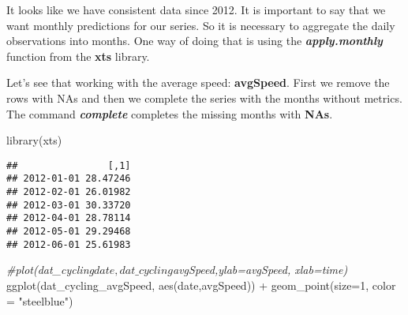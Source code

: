 \documentclass[
]{article}
\newenvironment{Shaded}{\begin{snugshade}}{\end{snugshade}}
\newcommand{\AttributeTok}[1]{\textcolor[rgb]{0.77,0.63,0.00}{#1}}
\newcommand{\CommentTok}[1]{\textcolor[rgb]{0.56,0.35,0.01}{\textit{#1}}}
\newcommand{\DecValTok}[1]{\textcolor[rgb]{0.00,0.00,0.81}{#1}}
\newcommand{\FunctionTok}[1]{\textcolor[rgb]{0.00,0.00,0.00}{#1}}
\newcommand{\NormalTok}[1]{#1}
\newcommand{\OtherTok}[1]{\textcolor[rgb]{0.56,0.35,0.01}{#1}}
\newcommand{\SpecialCharTok}[1]{\textcolor[rgb]{0.00,0.00,0.00}{#1}}
\newcommand{\StringTok}[1]{\textcolor[rgb]{0.31,0.60,0.02}{#1}}
\begin{document}
It looks like we have consistent data since 2012. It is important to say
that we want monthly predictions for our series. So it is necessary to
aggregate the daily observations into months. One way of doing that is
using the \textbf{\emph{apply.monthly}} function from the \textbf{xts}
library.

Let's see that working with the average speed: \textbf{avgSpeed}. First
we remove the rows with NAs and then we complete the series with the
months without metrics. The command \textbf{\emph{complete}} completes
the missing months with \textbf{NAs}.

\begin{Shaded}
\begin{Highlighting}[]
\FunctionTok{library}\NormalTok{(xts)}
\end{Highlighting}
\end{Shaded}

\begin{Shaded}
\end{Shaded}

\begin{verbatim}
##                [,1]
## 2012-01-01 28.47246
## 2012-02-01 26.01982
## 2012-03-01 30.33720
## 2012-04-01 28.78114
## 2012-05-01 29.29468
## 2012-06-01 25.61983
\end{verbatim}

\begin{Shaded}
\begin{Highlighting}[]
\CommentTok{\#plot(dat\_cycling$date,dat\_cycling$avgSpeed,ylab=\textquotesingle{}avgSpeed\textquotesingle{}, xlab=\textquotesingle{}time\textquotesingle{})}
\FunctionTok{ggplot}\NormalTok{(dat\_cycling\_avgSpeed, }\FunctionTok{aes}\NormalTok{(date,avgSpeed)) }\SpecialCharTok{+} \FunctionTok{geom\_point}\NormalTok{(}\AttributeTok{size=}\DecValTok{1}\NormalTok{, }\AttributeTok{color =} \StringTok{"steelblue"}\NormalTok{)}
\end{Highlighting}
\end{Shaded}
\end{document}
